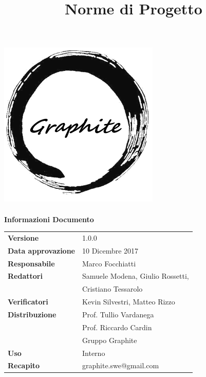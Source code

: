 \documentclass[openany,12pt,a4paper]{report}
\title{Norme di Progetto}
\author{}
\begin{document}
	\makeatletter
	\begin{titlepage}
		\setlength{\headsep}{0pt}  
		\begin{center}			
			\includegraphics[width=0.5\linewidth]{logo.png}\\[1em]
			{\huge \bfseries  \@title }\\[10ex]
			\textbf{\Large Informazioni Documento} \\[2em]
			\bgroup
			\def\arraystretch{1.5}
			\begin{tabular}{l|l}
				\textbf{Versione} & 1.0.0 \\
				\textbf{Data approvazione} & 10 Dicembre 2017 \\
				\textbf{Responsabile} & Marco Focchiatti \\
				\textbf{Redattori} & Samuele Modena, Giulio Rossetti,\\ 
				& Cristiano Tessarolo \\
				\textbf{Verificatori} & Kevin Silvestri, Matteo Rizzo \\
				\textbf{Distribuzione} & Prof. Tullio Vardanega \\
				 & Prof. Riccardo Cardin \\
				 & Gruppo Graphite \\
				\textbf{Uso} & Interno \\
				\textbf{Recapito} & graphite.swe@gmail.com \\
			\end{tabular}
		\egroup
		\end{center}
	\end{titlepage}
	\makeatother

	\thispagestyle{empty}
	\newpage
			
	
	
	\tableofcontents
	
	
	
	
	
	
	
	
	
\end{document}

